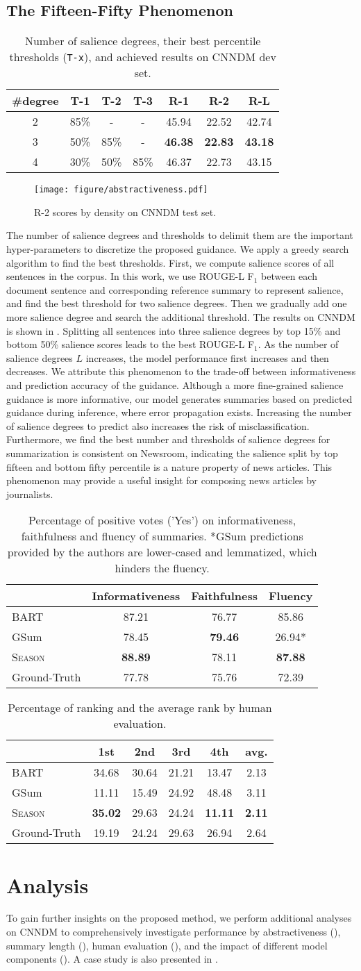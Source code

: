 \documentclass[11pt]{article}
\newcommand{\MODEL}{\mbox{\textsc{Season}}\xspace}
\newcommand{\TABLESALIENCETHRESHOLDCNNDM}{
    \begin{table}[!t]\centering
        \small
        \setlength{\tabcolsep}{5pt}
        \begin{tabular}{cccc|ccc}\toprule
            \textbf{\#degree} &\textbf{T-1} &\textbf{T-2} &\textbf{T-3} &\textbf{R-1} &\textbf{R-2} &\textbf{R-L}
            \\\midrule
            2 & 85\% & - & - & 45.94 & 22.52 & 42.74 \\
            3 & 50\% &  85\% & - & \textbf{46.38} & \textbf{22.83} & \textbf{43.18}  \\
            4 & 30\% & 50\% &  85\%  & 46.37 & 22.73 & 43.15 \\\bottomrule
        \end{tabular}
        \caption{\small Number of salience degrees, their best percentile thresholds (\texttt{T-x}), and achieved results on CNNDM dev set. }
        \label{tab:threshold}
        \vspace{-0.5em}
    \end{table}
}
\newcommand{\FIGURECNNDMSUBSETS}{
    \begin{figure}[t]
      \begin{center}
        \texttt{[image: figure/abstractiveness.pdf]} \end{center}
      \caption{\small R-2 scores by density on CNNDM test set.
      }
      \label{fig:cnndm_subsets}
      \vspace{-0.5em}
    \end{figure}
}
\newcommand{\TABLEHUMANEVAL}{
    \begin{table}[!t]
        \centering
        \small
        \setlength{\tabcolsep}{3.5pt}
        \begin{tabular}{lccc}\toprule
             &\textbf{Informativeness} &\textbf{Faithfulness} &\textbf{Fluency} \\\midrule
            BART   & 87.21 & 76.77 & 85.86 \\
            GSum   & 78.45 & \textbf{79.46} & 26.94*\\
            \MODEL & \textbf{88.89} & 78.11 & \textbf{87.88} \\
            Ground-Truth   & 77.78 & 75.76 & 72.39	\\\bottomrule
        \end{tabular}
        \caption{\small Percentage of positive votes ('Yes') on informativeness, faithfulness and fluency of summaries. *GSum predictions provided by the authors are lower-cased and lemmatized, which hinders the fluency. }
        \label{tab:human_evaluation_questions}
        \vspace{-0.5em}
    \end{table}
}
\newcommand{\TABLEHUMANRANK}{
    \begin{table}[!t]
        \centering
        \small
        \begin{tabular}{lccccc}\toprule
             &\textbf{1st} &\textbf{2nd} &\textbf{3rd} & \textbf{4th} & \textbf{avg.}\\\midrule
            BART   & 34.68 & 30.64 & 21.21 & 13.47 & 2.13 \\
            GSum   & 11.11 & 15.49 & 24.92 & 48.48 & 3.11 \\
            \MODEL & \textbf{35.02} & 29.63 & 24.24 & \textbf{11.11} & \textbf{2.11} \\
            Ground-Truth   & 19.19 & 24.24 & 29.63 & 26.94 & 2.64	\\\bottomrule
        \end{tabular}
        \caption{\small Percentage of ranking and the average rank by human evaluation.}
        \label{tab:human_evaluation_ranking}
        \vspace{-1em}
    \end{table}
}
\begin{document}
\subsection{The Fifteen-Fifty Phenomenon}
\label{sec:principle}
\TABLESALIENCETHRESHOLDCNNDM
\FIGURECNNDMSUBSETS

The number of salience degrees and thresholds to delimit them are the important hyper-parameters to discretize the proposed guidance.
We apply a greedy search algorithm to find the best thresholds.
First, we compute salience scores of all sentences in the corpus. In this work, we use ROUGE-L F$_{1}$ between each document sentence and corresponding reference summary to represent salience, and find the best threshold for two salience degrees.
Then we gradually add one more salience degree and search the additional threshold.
The results on CNNDM is shown in .
Splitting all sentences into three salience degrees by top 15\% and bottom 50\% salience scores leads to the best ROUGE-L F$_{1}$.
As the number of salience degrees $L$ increases, the model performance first increases and then decreases. We attribute this phenomenon to the trade-off between informativeness and prediction accuracy of the guidance. Although a more fine-grained salience guidance is more informative, our model generates summaries based on predicted guidance during inference, where error propagation exists. Increasing the number of salience degrees to predict also increases the risk of misclassification.
Furthermore, we find the best number and thresholds of salience degrees for summarization is consistent on Newsroom, indicating the salience split by top fifteen and bottom fifty percentile is a nature property of news articles.
This phenomenon may provide a useful insight for composing news articles by journalists.

\TABLEHUMANEVAL
\TABLEHUMANRANK



\section{Analysis}
To gain further insights on the proposed method, we perform additional analyses on CNNDM to comprehensively investigate performance by abstractiveness (), 
summary length (), human evaluation (), and the impact of different model components ().  A case study is also presented in . 
\end{document}
